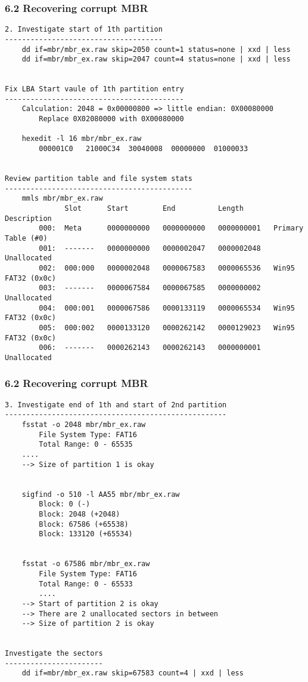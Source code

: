 \begin{frame}[fragile]
  \frametitle{6.2 Recovering corrupt MBR}
  \begin{lstlisting}[basicstyle=\tiny]
2. Investigate start of 1th partition
-------------------------------------
    dd if=mbr/mbr_ex.raw skip=2050 count=1 status=none | xxd | less
    dd if=mbr/mbr_ex.raw skip=2047 count=4 status=none | xxd | less


Fix LBA Start vaule of 1th partition entry
------------------------------------------
    Calculation: 2048 = 0x00000800 => little endian: 0X00080000
        Replace 0X02080000 with 0X00080000

    hexedit -l 16 mbr/mbr_ex.raw
        000001C0   21000C34  30040008  00000000  01000033


Review partition table and file system stats
--------------------------------------------
    mmls mbr/mbr_ex.raw 
              Slot      Start        End          Length       Description
        000:  Meta      0000000000   0000000000   0000000001   Primary Table (#0)
        001:  -------   0000000000   0000002047   0000002048   Unallocated
        002:  000:000   0000002048   0000067583   0000065536   Win95 FAT32 (0x0c)
        003:  -------   0000067584   0000067585   0000000002   Unallocated
        004:  000:001   0000067586   0000133119   0000065534   Win95 FAT32 (0x0c)
        005:  000:002   0000133120   0000262142   0000129023   Win95 FAT32 (0x0c)
        006:  -------   0000262143   0000262143   0000000001   Unallocated
  \end{lstlisting}
\end{frame}


\begin{frame}[fragile]
  \frametitle{6.2 Recovering corrupt MBR}
  \begin{lstlisting}[basicstyle=\tiny]
3. Investigate end of 1th and start of 2nd partition
----------------------------------------------------
    fsstat -o 2048 mbr/mbr_ex.raw
        File System Type: FAT16
        Total Range: 0 - 65535
	....
	--> Size of partition 1 is okay


    sigfind -o 510 -l AA55 mbr/mbr_ex.raw
        Block: 0 (-)
        Block: 2048 (+2048)
        Block: 67586 (+65538)
        Block: 133120 (+65534)


    fsstat -o 67586 mbr/mbr_ex.raw
        File System Type: FAT16
        Total Range: 0 - 65533
        ....
	--> Start of partition 2 is okay
	--> There are 2 unallocated sectors in between
	--> Size of partition 2 is okay 


Investigate the sectors
-----------------------
    dd if=mbr/mbr_ex.raw skip=67583 count=4 | xxd | less
  \end{lstlisting}
\end{frame}


